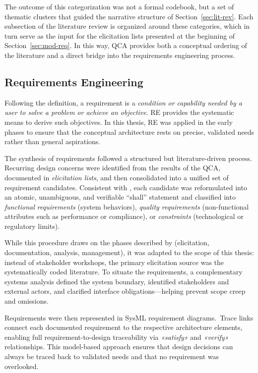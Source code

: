 The outcome of this categorization was not a formal codebook, but a set of thematic clusters that guided the narrative structure of Section~\ref{sec:lit-rev}. Each subsection of the literature review is organized around these categories, which in turn serve as the input for the elicitation lists presented at the beginning of Section~\ref{sec:mod-req}. In this way, QCA provides both a conceptual ordering of the literature and a direct bridge into the requirements engineering process.

\subsection{Requirements Engineering}\label{subsec:re-sa} %
Following the \textcite{IEEEStandard1990} definition, a requirement is a \emph{condition or capability needed by a user to solve a problem or achieve an objective}. RE provides the systematic means to derive such objectives. In this thesis, RE was applied in the early phases to ensure that the conceptual architecture rests on precise, validated needs rather than general aspirations.

The synthesis of requirements followed a structured but literature-driven process. Recurring design concerns were identified from the results of the QCA, documented in \emph{elicitation lists}, and then consolidated into a unified set of requirement candidates. Consistent with \textcite{glinzHandbook2020}, each candidate was reformulated into an atomic, unambiguous, and verifiable “shall” statement and classified into \emph{functional requirements} (system behaviors), \emph{quality requirements} (non-functional attributes such as performance or compliance), or \emph{constraints} (technological or regulatory limits).

While this procedure draws on the phases described by \textcite{herrmannGrundlagen2022} (elicitation, documentation, analysis, management), it was adapted to the scope of this thesis: instead of stakeholder workshops, the primary elicitation source was the systematically coded literature. To situate the requirements, a complementary systems analysis defined the system boundary, identified stakeholders and external actors, and clarified interface obligations---helping prevent scope creep and omissions.

Requirements were then represented in SysML requirement diagrams.~Trace links connect each documented requirement to the respective architecture elements, enabling full requirement-to-design traceability via \emph{«satisfy»} and \emph{«verify»} relationships. This model-based approach ensures that design decisions can always be traced back to validated needs and that no requirement was overlooked.

